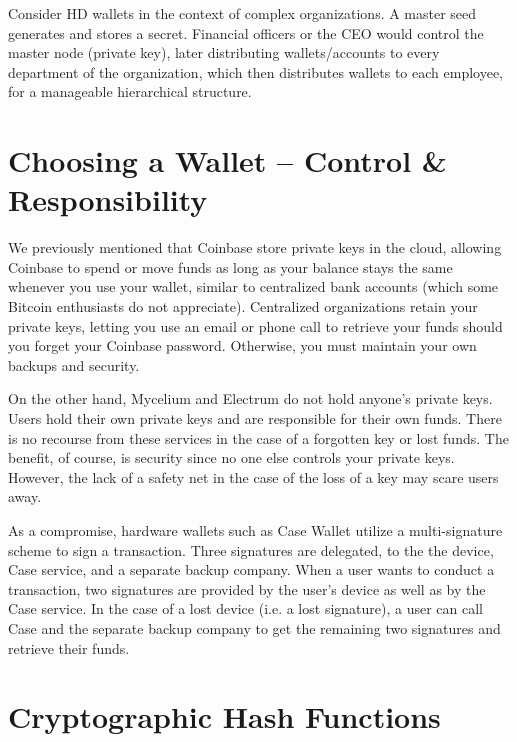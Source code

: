 \documentclass[full.tex]{subfiles}
\begin{document}
   Consider HD wallets in the context of complex organizations. A master seed generates and stores a secret. Financial officers or the CEO would control the master node (private key), later distributing wallets/accounts to every department of the organization, which then distributes wallets to each employee, for a manageable hierarchical structure.
   
   \section*{Choosing a Wallet -- Control \& Responsibility}
    
   We previously mentioned that Coinbase store private keys in the cloud, allowing Coinbase to spend or move funds as long as your balance stays the same whenever you use your wallet, similar to centralized bank accounts (which some Bitcoin enthusiasts do not appreciate). Centralized organizations retain your private keys, letting you use an email or phone call to retrieve your funds should you forget your Coinbase password. Otherwise, you must maintain your own backups and security.
   
   On the other hand, Mycelium and Electrum do not hold anyone's private keys. Users hold their own private keys and are responsible for their own funds. There is no recourse from these services in the case of a forgotten key or lost funds. The benefit, of course, is security since no one else controls your private keys. However, the lack of a safety net in the case of the loss of a key may scare users away.
   
   As a compromise, hardware wallets such as Case Wallet utilize a multi-signature scheme to sign a transaction. Three signatures are delegated, to the the device, Case service, and a separate backup company. When a user wants to conduct a transaction, two signatures are provided by the user's device as well as by the Case service. In the case of a lost device (i.e. a lost signature), a user can call Case and the separate backup company to get the remaining two signatures and retrieve their funds.
   
   
   \section*{Cryptographic Hash Functions}
   
\end{document}
